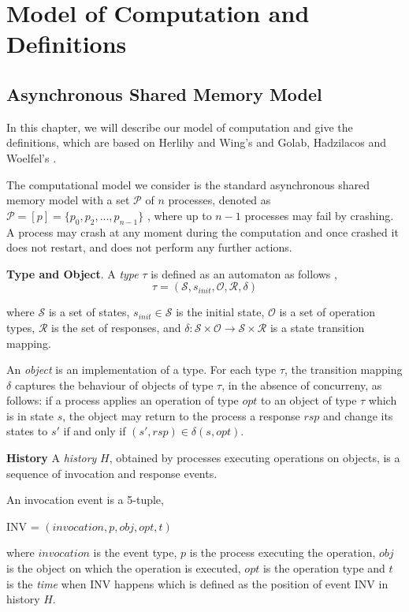 
\chapter{Model of Computation and Definitions}
\section{Asynchronous Shared Memory Model}
In this chapter, we will describe our model of computation and give the definitions, which are based on Herlihy
and Wing's \cite{Herlihy:1990:LCC:78969.78972} and Golab, Hadzilacos and Woelfel's \cite{InProc-GHHW2007a}.

The computational model we consider is the standard asynchronous shared memory model with a set $\mathcal{P}$
of $n$ processes, denoted as $\mathcal{P} = [p] =\{p_0, p_2,...,p_{n-1}\}$ , where up to $n-1$ processes may fail by crashing.
A process may crash at any moment during the computation and once crashed it does not restart,
and does not perform any further actions.

\textbf{Type and Object}.
A \emph{type} $\tau$ is defined as an automaton as follows \cite{InProc-GHHW2007a},
$$\tau = (\mathcal{S}, s_{init},\mathcal{O},\mathcal{R} ,\delta )$$

where $\mathcal{S}$ is a set of states, $s_{init} \in \mathcal{S}$ is the initial state, $\mathcal{O}$ is a set of
operation types, $\mathcal{R}$ is the set of responses, and
$\delta :\mathcal{S} \times \mathcal{O} \to \mathcal{S} \times \mathcal{R}$ is a state transition mapping.

An \emph{object} is an implementation of a type. For each type $\tau$, the transition mapping $\delta$ captures the
behaviour of objects of type $\tau$, in the absence of concurreny,
as follows: if a process applies an operation of type $opt$ to an object of type $\tau$ which is in state $s$, the object
may return to the process a response $rsp$ and change its states to $s'$ if and only if $(s', rsp) \in \delta(s, opt)$.

\textbf{History}
A \emph{history} $H$, obtained by processes executing
operations on objects, is a sequence of invocation
and response events.

An invocation event is a 5-tuple,
\begin{center}
INV = $(invocation, p, obj, opt, t)$
\end{center}
where $invocation$ is the event type, $p$ is the process executing the operation, $obj$ is the object on which the operation
is executed, $opt$ is the operation type and $t$ is the \emph{time} when INV happens which is defined
as the position of event INV in history $H$.

